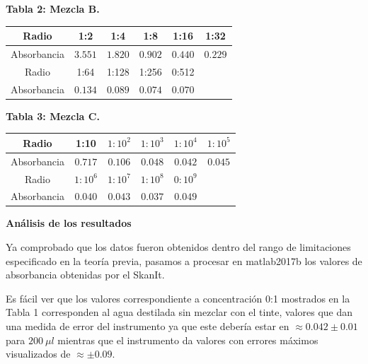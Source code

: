 \textbf{Tabla 2: Mezcla B.}
    
\begin{tabular}{|c|c|c|c|c|c|}
    \hline
    Radio & 1:2 & 1:4 & 1:8 & 1:16 & 1:32\\
    \hline
    Absorbancia & $3.551$ & $1.820$ & $0.902$ & $0.440$ & $0.229$\\
    \hline\hline\hline
    Radio & 1:64 & 1:128 & 1:256 & 0:512 & \\
    \hline
    Absorbancia & $0.134$ & $0.089$ & $0.074$ & $0.070$ &\\
    \hline
\end{tabular}

\textbf{Tabla 3: Mezcla C.}
    
\begin{tabular}{|c|c|c|c|c|c|}
    \hline
    Radio & 1:10 & $1:10^2$ & $1:10^3$ & $1:10^4$ & $1:10^5$\\
    \hline
    Absorbancia & $0.717$ & $0.106$ & $0.048$ & $0.042$ & $0.045$\\
    \hline\hline\hline
    Radio & $1:10^6$ & $1:10^7$ & $1:10^8$ & $0:10^9$ & \\
    \hline
    Absorbancia & $0.040$ & $0.043$ & $0.037$ & $0.049$ & \\
    \hline
\end{tabular}


\textbf{\textcolor{azul50}{Análisis de los resultados}}

Ya comprobado que los datos fueron obtenidos dentro del rango de limitaciones especificado en la teoría previa, pasamos a procesar en matlab2017b los valores de absorbancia obtenidas por el SkanIt.

Es fácil ver que los valores correspondiente a concentración 0:1 mostrados en la Tabla 1 corresponden al agua destilada sin mezclar con el tinte, valores que dan una medida de error del instrumento ya que este debería estar en $\approx 0.042\pm 0.01$ para $200~\mu l$ mientras que el instrumento da valores con errores máximos visualizados de $\approx\pm 0.09$.

